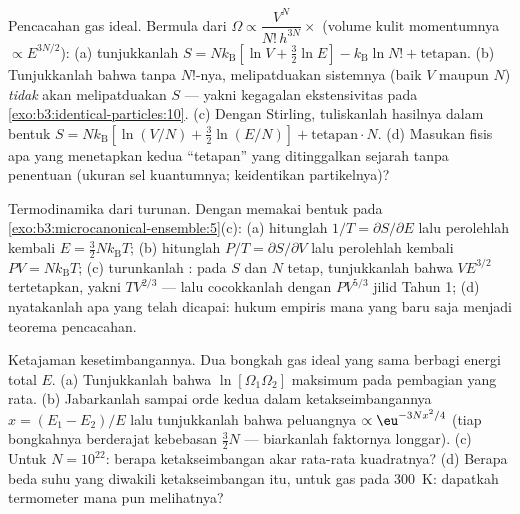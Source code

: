 \begin{exercise}[$\star\star$]\label{exo:b3:microcanonical-ensemble:5}
Pencacahan gas ideal. Bermula dari
$\Omega \propto \dfrac{V^N}{N!\,h^{3N}}\times$ (volume kulit
momentumnya $\propto E^{3N/2}$): (a) tunjukkanlah $S = Nk_{\text{B}}[\ln V +
\tfrac32\ln E] - k_{\text{B}}\ln N! + \text{tetapan}$. (b) Tunjukkanlah bahwa
tanpa $N!$-nya, melipatduakan sistemnya (baik $V$ maupun $N$)
\emph{tidak} akan melipatduakan $S$ --- yakni kegagalan ekstensivitas
pada \cref{exo:b3:identical-particles:10}. (c) Dengan Stirling,
tuliskanlah hasilnya dalam bentuk $S = Nk_{\text{B}}[\ln(V/N) + \tfrac32\ln(E/N)]
+ \text{tetapan}\cdot N$. (d) Masukan fisis apa yang menetapkan kedua
``tetapan'' yang ditinggalkan sejarah tanpa penentuan (ukuran sel
kuantumnya; keidentikan partikelnya)?
\end{exercise}

\begin{exercise}[$\star\star$]\label{exo:b3:microcanonical-ensemble:6}
Termodinamika dari turunan. Dengan memakai bentuk pada
\cref{exo:b3:microcanonical-ensemble:5}(c): (a) hitunglah $1/T =
\partial S/\partial E$ lalu perolehlah kembali $E = \tfrac32 Nk_{\text{B}}T$;
(b) hitunglah $P/T = \partial S/\partial V$ lalu perolehlah kembali $PV =
Nk_{\text{B}}T$; (c) turunkanlah : pada $S$ dan $N$
tetap, tunjukkanlah bahwa $VE^{3/2}$ tertetapkan, yakni $TV^{2/3}$ ---
lalu cocokkanlah dengan $PV^{5/3}$ jilid Tahun 1; (d) nyatakanlah apa
yang telah dicapai: hukum empiris mana yang baru saja menjadi teorema
pencacahan.
\end{exercise}

\begin{exercise}[$\star\star$]\label{exo:b3:microcanonical-ensemble:7}
Ketajaman kesetimbangannya. Dua bongkah gas ideal yang sama berbagi
energi total $E$. (a) Tunjukkanlah bahwa $\ln[\Omega_1\Omega_2]$
maksimum pada pembagian yang rata. (b) Jabarkanlah sampai orde kedua
dalam ketakseimbangannya $x =
(E_1 - E_2)/E$ lalu tunjukkanlah bahwa
peluangnya $\propto\eu^{-3Nx^2/4}$ (tiap bongkahnya berderajat kebebasan
$\tfrac32 N$ --- biarkanlah faktornya longgar). (c) Untuk
$N = 10^{22}$: berapa ketakseimbangan akar rata-rata kuadratnya? (d)
Berapa beda suhu yang diwakili ketakseimbangan itu, untuk gas pada
\qty{300}{K}: dapatkah termometer mana pun melihatnya?
\end{exercise}

